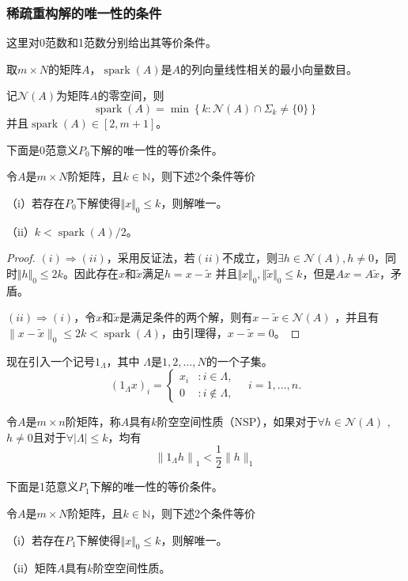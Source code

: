 \subsubsection{稀疏重构解的唯一性的条件}
这里对0范数和1范数分别给出其等价条件。
\begin{definition}
    取$m\times N$的矩阵$A$，$ \operatorname{spark}(A)$是$A$的列向量线性相关的最小向量数目。
\end{definition}
\begin{lemma}
    记$\mathcal{N}(A)$为矩阵$A$的零空间，则
   \begin{equation}
    \operatorname{spark}(A)=\min \left\{k: \mathcal{N}(A) \cap \Sigma_k \neq\{0\}\right\}
   \end{equation}
   并且$\operatorname{spark}(A) \in[2,m+1]$。
\end{lemma}
下面是0范意义$P_0$下解的唯一性的等价条件。
\begin{theorem}
    令$A$是$m\times N$阶矩阵，且$k \in \mathbb{N}$，则下述2个条件等价\par
    （i）若存在$P_0$下解使得$\Vert x \Vert_0 \le k$，则解唯一。\par
    （ii）$k<\operatorname{spark}(A)/2 $。
\end{theorem}
\begin{proof}
    $(i)\Rightarrow (ii)$，采用反证法，若$(ii)$不成立，则$\exists h \in \mathcal{N}(A)
    ,h\neq 0$，同时$\Vert h \Vert_0 \le 2k$。因此存在$x$和$\tilde{x}$满足$h=x-\tilde{x}$
    并且$\Vert x \Vert_0 ,\Vert \tilde{x} \Vert_0 \le k$，但是$Ax=A\tilde{x}$，矛盾。\par
    $(ii)\Rightarrow (i)$，令$x$和$\tilde{x}$是满足条件的两个解，则有$x-\tilde{x}\in \mathcal{N}(A)$
    ，并且有$\|x-\tilde{x}\|_0 \leq 2 k<\operatorname{spark}(A)$，由引理得，$x-\tilde{x}=0$。
\end{proof}
现在引入一个记号$1_{\Lambda}$，其中 $\Lambda$是${1,2,\ldots,N}$的一个子集。
\begin{equation}
    \left(1_{\Lambda} x\right)_i=\left\{ \begin{array}{rl}
    x_i & : i \in \Lambda,\\
    0 & : i \notin \Lambda,
    \end{array} \quad i=1,\ldots, n .\right .
\end{equation}
\begin{definition}
    令$A$是$m\times n$阶矩阵，称$A$具有$k$阶空空间性质（NSP），如果对于$\forall h \in \mathcal{N}(A)$
    ,$h \neq 0$且对于$\forall |\Lambda| \leq k$，均有
    \begin{equation}
        \left\|1_{\Lambda} h\right\|_1<\frac{1}{2}\|h\|_1
    \end{equation}
\end{definition}
下面是1范意义$P_1$下解的唯一性的等价条件。
\begin{theorem}
    令$A$是$m\times N$阶矩阵，且$k \in \mathbb{N}$，则下述2个条件等价\par
    （i）若存在$P_1$下解使得$\Vert x \Vert_0 \le k$，则解唯一。\par
    （ii）矩阵$A$具有$k$阶空空间性质。
\end{theorem}

